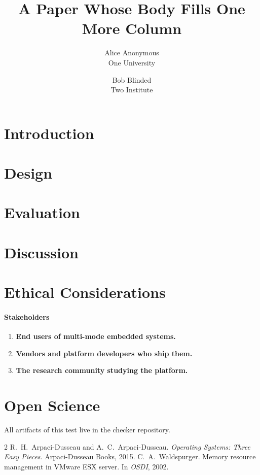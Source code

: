 \documentclass[letterpaper,twocolumn,10pt]{article}
\date{}
\title{\Large \bf A Paper Whose Body Fills One More Column}
\author{{\rm Alice Anonymous}\\One University \and {\rm Bob Blinded}\\Two Institute}
\begin{document}
\maketitle

\begin{abstract}
\lipsum[1][1-5]
\end{abstract}

\section{Introduction}
\lipsum[1-30]

\section{Design}
\lipsum[31-60]

\section{Evaluation}
\lipsum[61-90]

\section{Discussion}
\lipsum[91-129]

\newpage
\appendix
\section*{Ethical Considerations}

\paragraph{Stakeholders}
\begin{enumerate}
  \item \textbf{End users of multi-mode embedded systems.} \lipsum[1][1-3]
  \item \textbf{Vendors and platform developers who ship them.} \lipsum[2][1-3]
  \item \textbf{The research community studying the platform.} \lipsum[3][1-3]
\end{enumerate}

\section*{Open Science}
All artifacts of this test live in the checker repository.

\begin{thebibliography}{2}
 R.~H.\ Arpaci-Dusseau and A.~C.\ Arpaci-Dusseau.
  \emph{Operating Systems: Three Easy Pieces}. Arpaci-Dusseau Books, 2015.
 C.~A.\ Waldspurger. Memory resource management in VMware ESX
  server. In \emph{OSDI}, 2002.
\end{thebibliography}
\end{document}
